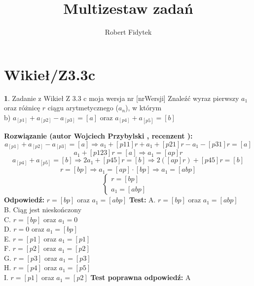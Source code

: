 \documentclass[12pt, a4paper]{article}
\title{Multizestaw zadań}
\author{Robert Fidytek}
\date{}
\theoremstyle{definition} %
\newtheorem{zad}{}
\newcommand{\kategoria}[1]{\section{#1}} %
\newcommand{\zadStart}[1]{\begin{zad}#1\newline} %
\newcommand{\zadStop}{\end{zad}}   %
\newcommand{\rozwStart}[2]{\noindent \textbf{Rozwiązanie (autor #1 , recenzent #2): }\newline} %
\newcommand{\rozwStop}{\newline}                                            %
\newcommand{\odpStart}{\noindent \textbf{Odpowiedź:}\newline}    %
\newcommand{\odpStop}{\newline}                                             %
\newcommand{\testStart}{\noindent \textbf{Test:}\newline} %
\newcommand{\testStop}{\newline} %
\newcommand{\kluczStart}{\noindent \textbf{Test poprawna odpowiedź:}\newline} %
\newcommand{\kluczStop}{\newline} %
\begin{document}
\maketitle


\kategoria{Wikieł/Z3.3c}
\zadStart{Zadanie z Wikieł Z 3.3 c moja wersja nr [nrWersji]}
Znaleźć wyraz pierwszy $a_{1}$ oraz różnicę $r$ ciągu arytmetycznego ($a_{n}$), w którym \\
b) $a_{[p1]}+a_{[p2]}-a_{[p3]}=[a]$ oraz $a_{[p4]}+ a_{[p5]}=[b]$
\zadStop
\rozwStart{Wojciech Przybylski}{}
$$a_{[p1]}+a_{[p2]}-a_{[p3]}=[a]\Rightarrow a_{1}+[p11]r+a_{1}+[p21]r-a_{1}-[p31]r=[a]$$
$$a_{1}+[p123]r=[a] \Rightarrow a_{1}=[ap]r$$
$$a_{[p4]}+ a_{[p5]}=[b] \Rightarrow 2a_{1}+[p45]r=[b] \Rightarrow 2([ap]r)+[p45]r=[b]$$
$$r=[bp] \Rightarrow a_{1}=[ap]\cdot [bp] \Rightarrow a_{1}=[abp] $$
$$
 \left\{ \begin{array}{ll}
r=[bp] & \\
a_{1}=[abp] &
\end{array} \right.
$$
\rozwStop
\odpStart
$r=[bp]$ oraz $a_{1}=[abp]$
\odpStop
\testStart
A. $r=[bp]$ oraz $a_{1}=[abp]$\\
B. Ciąg jest nieskończony\\
C. $r=[bp]$ oraz $a_{1}=0$\\
D. $r=0$ oraz $a_{1}=[bp]$\\
E. $r=[p1]$ oraz $a_{1}=[p1]$\\
F. $r=[p2]$ oraz $a_{1}=[p2]$\\
G. $r=[p3]$ oraz $a_{1}=[p3]$\\
H. $r=[p4]$ oraz $a_{1}=[p5]$\\
I. $r=[p1]$ oraz $a_{1}=[p2]$
\testStop
\kluczStart
A
\kluczStop
\end{document}
